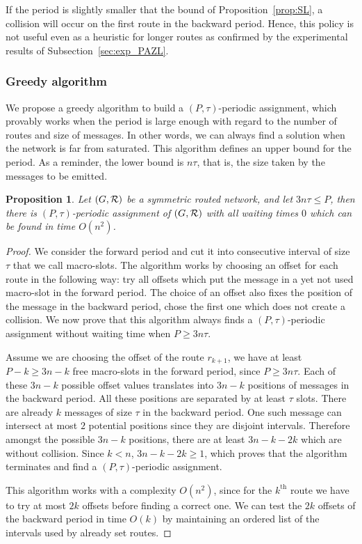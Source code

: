 \documentclass[a4paper,10pt]{article}
\newtheorem{proposition}{Proposition}
\begin{document}
      If the period is slightly smaller that the bound of Proposition~\ref{prop:SL}, a collision will occur on the first route in the backward period. Hence, this policy is not useful even as a heuristic for longer routes as confirmed by the experimental results of Subsection~\ref{sec:exp_PAZL}. 

   
    \subsubsection*{Greedy algorithm}
    
    We propose a greedy algorithm to build a $(P,\tau)$-periodic assignment, which provably works when
    the period is large enough with regard to the number of routes and size of messages. In other words, 
    we can always find a solution when the network is far from saturated. This algorithm defines an upper bound for the period. As a reminder, the lower bound is $n\tau$, that is, the size taken by the messages to be emitted.
    
    \begin{proposition}
     Let $(G, {\cal R})$ be a symmetric routed network, and let $ 3n\tau \leq P$, then there is $(P,\tau)$-periodic assignment of $(G, {\cal R})$ with all waiting times $0$ which can be found in time $O(n^2)$.
    \end{proposition}
    \begin{proof}
     We consider the forward period and cut it into consecutive interval of size $\tau$ that we call macro-slots. The algorithm works by choosing an offset for each route in the following way: try all offsets which put the message in a yet not used macro-slot in the forward
     period. The choice of an offset also fixes the position of the message in the backward period, chose the first one which does not create a collision. We now prove that this algorithm always finds a $(P,\tau)$-periodic assignment without waiting time when $P \geq 3n\tau$.
     
     Assume we are choosing the offset of the route $r_{k+1}$, we have at least $P - k \geq 3n - k$ free macro-slots in the forward period, since $P \geq 3n\tau$. Each of these $3n - k$ possible offset values translates into $3n - k$ positions of messages in the backward period. All these positions are separated by at least $\tau$ slots. There are already $k$ messages of size $\tau$ in the backward period. One such message can intersect at most $2$ potential positions since they are disjoint intervals. Therefore  amongst the possible $3n - k$ positions, there are  at least $3n - k -2k$ which are without collision. Since $k < n$, $3n - k -2k \geq 1$, which proves that the algorithm terminates and find a  $(P,\tau)$-periodic assignment. 
     
     This algorithm works with a complexity $O(n^2)$, since for the $k^{\text{th}}$ route we have to try at most $2k$ offsets before finding a correct one. We can test the $2k$ offsets of the backward period in time $O(k)$ by maintaining an ordered list of the intervals used by already set routes.
     \end{proof}
     
\end{document}
